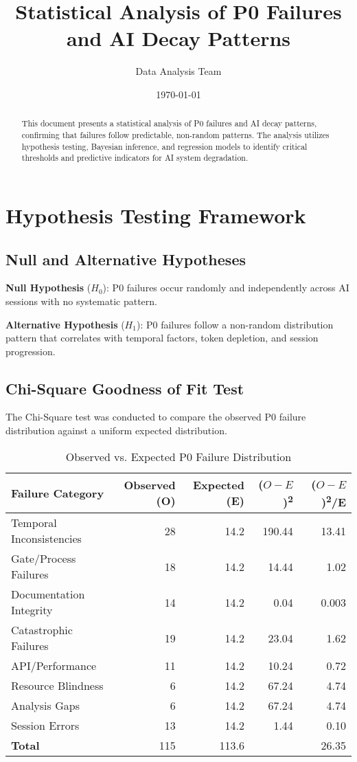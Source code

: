 \documentclass[12pt]{article}
\title{Statistical Analysis of P0 Failures and AI Decay Patterns}
\author{Data Analysis Team}
\date{\today}
\begin{document}
\maketitle
\begin{abstract}
This document presents a statistical analysis of P0 failures and AI decay patterns, confirming that failures follow predictable, non-random patterns. The analysis utilizes hypothesis testing, Bayesian inference, and regression models to identify critical thresholds and predictive indicators for AI system degradation.
\end{abstract}

\section{Hypothesis Testing Framework}

\subsection{Null and Alternative Hypotheses}
\textbf{Null Hypothesis} ($H_0$): P0 failures occur randomly and independently across AI sessions with no systematic pattern.

\textbf{Alternative Hypothesis} ($H_1$): P0 failures follow a non-random distribution pattern that correlates with temporal factors, token depletion, and session progression.

\subsection{Chi-Square Goodness of Fit Test}
The Chi-Square test was conducted to compare the observed P0 failure distribution against a uniform expected distribution.

\begin{table}[h!]
    \centering
    \begin{tabular}{lrrrr}
    \toprule
    \textbf{Failure Category} & \textbf{Observed (O)} & \textbf{Expected (E)} & \textbf{($O-E$)\textsuperscript{2}} & \textbf{($O-E$)\textsuperscript{2}/E} \\
    \midrule
    Temporal Inconsistencies & 28 & 14.2 & 190.44 & 13.41 \\
    Gate/Process Failures & 18 & 14.2 & 14.44 & 1.02 \\
    Documentation Integrity & 14 & 14.2 & 0.04 & 0.003 \\
    Catastrophic Failures & 19 & 14.2 & 23.04 & 1.62 \\
    API/Performance & 11 & 14.2 & 10.24 & 0.72 \\
    Resource Blindness & 6 & 14.2 & 67.24 & 4.74 \\
    Analysis Gaps & 6 & 14.2 & 67.24 & 4.74 \\
    Session Errors & 13 & 14.2 & 1.44 & 0.10 \\
    \midrule
    \textbf{Total} & 115 & 113.6 & & 26.35 \\
    \bottomrule
    \end{tabular}
    \caption{Observed vs. Expected P0 Failure Distribution}
    \label{tab:chi-square}
\end{table}
\end{document}
